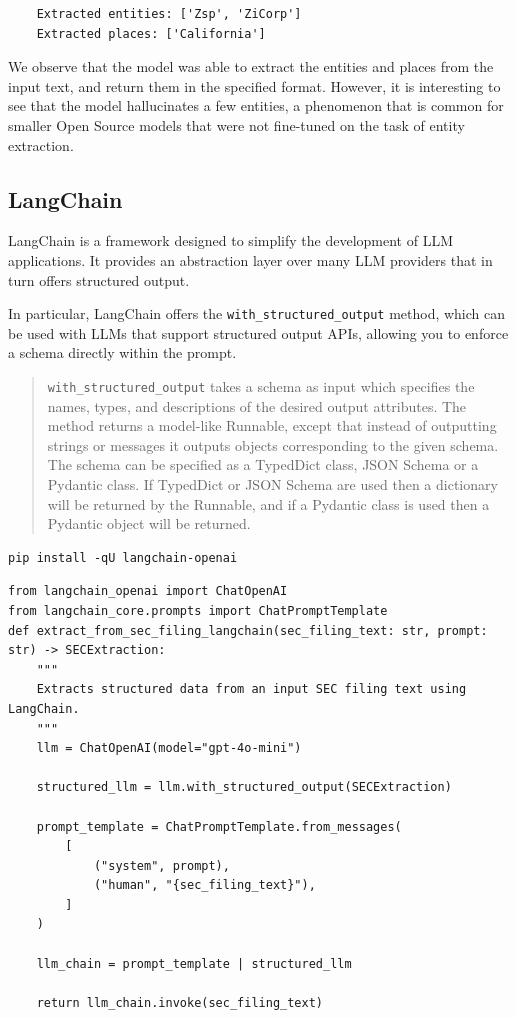 \begin{verbatim}
    Extracted entities: ['Zsp', 'ZiCorp']
    Extracted places: ['California']
\end{verbatim}

We observe that the model was able to extract the entities and places from the input text, and return them in the specified format. However, it is interesting to see that the model hallucinates a few entities, a phenomenon that is common for smaller Open Source models that were not fine-tuned on the task of entity extraction.
\subsection{LangChain}

LangChain is a framework designed to simplify the development of LLM applications. It provides an abstraction layer over many LLM providers that in turn offers structured output.

In particular, LangChain offers the \texttt{with\_structured\_output} method, which can be used with LLMs that support structured output APIs, allowing you to enforce a schema directly within the prompt.

\begin{quote}
\texttt{with\_structured\_output} takes a schema as input which specifies the names, types, and descriptions of the desired output attributes. The method returns a model-like Runnable, except that instead of outputting strings or messages it outputs objects corresponding to the given schema. The schema can be specified as a TypedDict class, JSON Schema or a Pydantic class. If TypedDict or JSON Schema are used then a dictionary will be returned by the Runnable, and if a Pydantic class is used then a Pydantic object will be returned.
\end{quote}

\begin{verbatim}
pip install -qU langchain-openai
\end{verbatim}

\begin{verbatim}
from langchain_openai import ChatOpenAI
from langchain_core.prompts import ChatPromptTemplate
def extract_from_sec_filing_langchain(sec_filing_text: str, prompt: str) -> SECExtraction:
    """
    Extracts structured data from an input SEC filing text using LangChain.
    """
    llm = ChatOpenAI(model="gpt-4o-mini")

    structured_llm = llm.with_structured_output(SECExtraction)

    prompt_template = ChatPromptTemplate.from_messages(
        [
            ("system", prompt),
            ("human", "{sec_filing_text}"),
        ]
    )

    llm_chain = prompt_template | structured_llm
    
    return llm_chain.invoke(sec_filing_text)
\end{verbatim}

